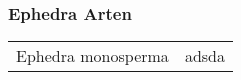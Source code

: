 \begin{frame}[t,label=ephedraarten]
  \frametitle{Ephedra Arten}
  \begin{table}[htpb]
    \begin{tabular}{cc}
      Ephedra monosperma & adsda  \\ 
    \end{tabular}
  \end{table}
\end{frame}


